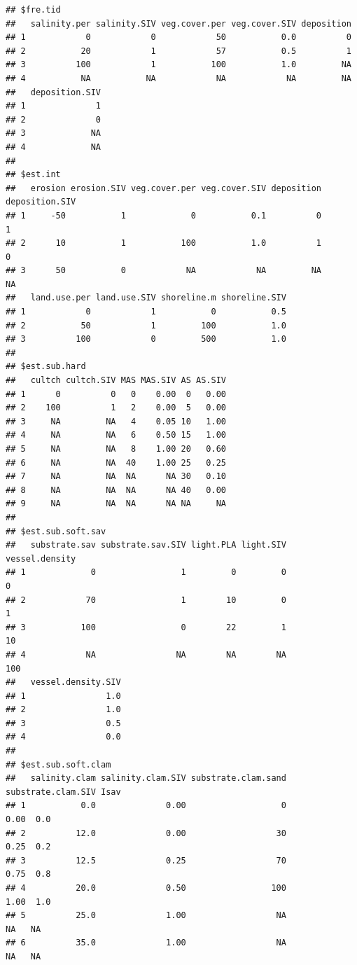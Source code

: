 \documentclass[
]{book}
\begin{document}
\begin{verbatim}
## $fre.tid
##   salinity.per salinity.SIV veg.cover.per veg.cover.SIV deposition
## 1            0            0            50           0.0          0
## 2           20            1            57           0.5          1
## 3          100            1           100           1.0         NA
## 4           NA           NA            NA            NA         NA
##   deposition.SIV
## 1              1
## 2              0
## 3             NA
## 4             NA
## 
## $est.int
##   erosion erosion.SIV veg.cover.per veg.cover.SIV deposition deposition.SIV
## 1     -50           1             0           0.1          0              1
## 2      10           1           100           1.0          1              0
## 3      50           0            NA            NA         NA             NA
##   land.use.per land.use.SIV shoreline.m shoreline.SIV
## 1            0            1           0           0.5
## 2           50            1         100           1.0
## 3          100            0         500           1.0
## 
## $est.sub.hard
##   cultch cultch.SIV MAS MAS.SIV AS AS.SIV
## 1      0          0   0    0.00  0   0.00
## 2    100          1   2    0.00  5   0.00
## 3     NA         NA   4    0.05 10   1.00
## 4     NA         NA   6    0.50 15   1.00
## 5     NA         NA   8    1.00 20   0.60
## 6     NA         NA  40    1.00 25   0.25
## 7     NA         NA  NA      NA 30   0.10
## 8     NA         NA  NA      NA 40   0.00
## 9     NA         NA  NA      NA NA     NA
## 
## $est.sub.soft.sav
##   substrate.sav substrate.sav.SIV light.PLA light.SIV vessel.density
## 1             0                 1         0         0              0
## 2            70                 1        10         0              1
## 3           100                 0        22         1             10
## 4            NA                NA        NA        NA            100
##   vessel.density.SIV
## 1                1.0
## 2                1.0
## 3                0.5
## 4                0.0
## 
## $est.sub.soft.clam
##   salinity.clam salinity.clam.SIV substrate.clam.sand substrate.clam.SIV Isav
## 1           0.0              0.00                   0               0.00  0.0
## 2          12.0              0.00                  30               0.25  0.2
## 3          12.5              0.25                  70               0.75  0.8
## 4          20.0              0.50                 100               1.00  1.0
## 5          25.0              1.00                  NA                 NA   NA
## 6          35.0              1.00                  NA                 NA   NA

\end{verbatim}
\end{document}
